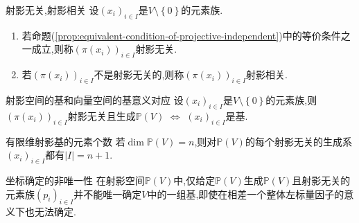 \begin{definition}{射影无关,射影相关}{}
	设$\left(x_{i}\right)_{i\in I}$是$V\setminus\left\{0\right\}$的元素族.
	\begin{enumerate}
		\item 若命题(\cref{prop:equivalent-condition-of-projective-independent})中的等价条件之一成立,则称$\left(\pi\left(x_{i}\right)\right)_{i\in I}$射影无关.
		\item 若$\left(\pi\left(x_{i}\right)\right)_{i\in I}$不是射影无关的,则称$\left(\pi\left(x_{i}\right)\right)_{i\in I}$射影相关.
	\end{enumerate}
\end{definition}

\begin{proposition}{射影空间的基和向量空间的基意义对应}{}
	设$\left(x_{i}\right)_{i\in I}$是$V\setminus\left\{0\right\}$的元素族,则$\left(\pi\left(x_{i}\right)\right)_{i\in I}$射影无关且生成$\mathbb{P}\left(V\right)$ $\iff$ $\left(x_{i}\right)_{i\in I}$是基.
\end{proposition}

\begin{corollary}{有限维射影基的元素个数}{}
	若$\dim\mathbb{P}\left(V\right)=n$,则对$\mathbb{P}\left(V\right)$的每个射影无关的生成系$\left(x_{i}\right)_{i\in I}$都有$\left|I\right|=n+1$.
\end{corollary}

\begin{remark}{坐标确定的非唯一性}{}
	在射影空间$\mathbb{P}\left(V\right)$中,仅给定$\mathbb{P}\left(V\right)$生成$\mathbb{P}\left(V\right)$且射影无关的元素族$\left(p_{i}\right)_{i\in I}$并不能唯一确定$V$中的一组基,即使在相差一个整体左标量因子的意义下也无法确定.
\end{remark}